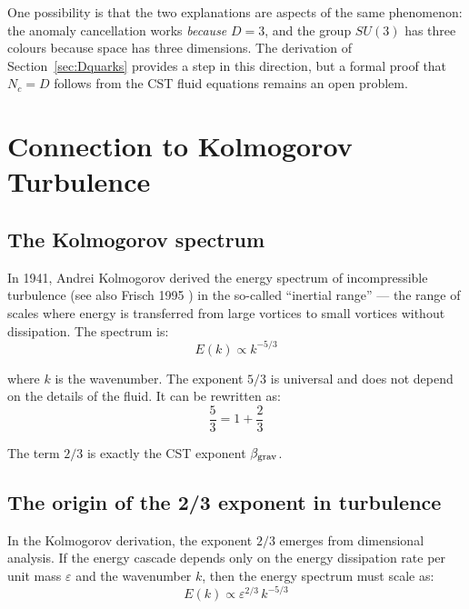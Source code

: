 \documentclass[10pt,a4paper]{article}
\begin{document}
One possibility is that the two explanations are aspects of the same phenomenon: the anomaly cancellation works \textit{because} $D = 3$, and the group $SU(3)$ has three colours because space has three dimensions. The derivation of Section~\ref{sec:Dquarks} provides a step in this direction, but a formal proof that $N_c = D$ follows from the CST fluid equations remains an open problem.


\section{Connection to Kolmogorov Turbulence}\label{sec:kolmogorov}

\subsection{The Kolmogorov spectrum}

In 1941, Andrei Kolmogorov \cite{Kolmogorov1941} derived the energy spectrum of incompressible turbulence (see also Frisch 1995 \cite{Frisch1995}) in the so-called ``inertial range'' --- the range of scales where energy is transferred from large vortices to small vortices without dissipation. The spectrum is:
\begin{equation}\label{eq:kolmogorov}
E(k) \propto k^{-5/3}
\end{equation}

where $k$ is the wavenumber. The exponent $5/3$ is universal and does not depend on the details of the fluid. It can be rewritten as:
\begin{equation}
\frac{5}{3} = 1 + \frac{2}{3}
\end{equation}

The term $2/3$ is exactly the CST exponent $\beta_{\rm grav}$.

\subsection{The origin of the 2/3 exponent in turbulence}

In the Kolmogorov derivation, the exponent $2/3$ emerges from dimensional analysis. If the energy cascade depends only on the energy dissipation rate per unit mass $\varepsilon$ and the wavenumber $k$, then the energy spectrum must scale as:
\begin{equation}
E(k) \propto \varepsilon^{2/3}\,k^{-5/3}
\end{equation}
\end{document}

